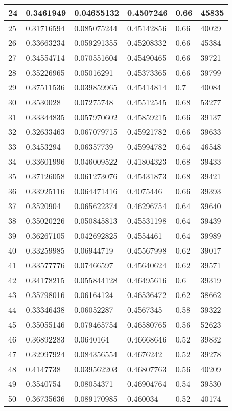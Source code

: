 \begin{longtable}{|l|l|l|l|l|l|}
24 & 0.3461949 & 0.04655132 & 0.4507246 & 0.66 & 45835 \\ \hline 
25 & 0.31716594 & 0.085075244 & 0.45142856 & 0.66 & 40029 \\ \hline 
26 & 0.33663234 & 0.059291355 & 0.45208332 & 0.66 & 45384 \\ \hline 
27 & 0.34554714 & 0.070551604 & 0.45490465 & 0.66 & 39721 \\ \hline 
28 & 0.35226965 & 0.05016291 & 0.45373365 & 0.66 & 39799 \\ \hline 
29 & 0.37511536 & 0.039859965 & 0.45414814 & 0.7 & 40084 \\ \hline 
30 & 0.3530028 & 0.07275748 & 0.45512545 & 0.68 & 53277 \\ \hline 
31 & 0.33344835 & 0.057970602 & 0.45859215 & 0.66 & 39137 \\ \hline 
32 & 0.32633463 & 0.067079715 & 0.45921782 & 0.66 & 39633 \\ \hline 
33 & 0.3453294 & 0.06357739 & 0.45994782 & 0.64 & 46548 \\ \hline 
34 & 0.33601996 & 0.046009522 & 0.41804323 & 0.68 & 39433 \\ \hline 
35 & 0.37126058 & 0.061273076 & 0.45431873 & 0.68 & 39421 \\ \hline 
36 & 0.33925116 & 0.064471416 & 0.4075446 & 0.66 & 39393 \\ \hline 
37 & 0.3520904 & 0.065622374 & 0.46296754 & 0.64 & 39640 \\ \hline 
38 & 0.35020226 & 0.050845813 & 0.45531198 & 0.64 & 39439 \\ \hline 
39 & 0.36267105 & 0.042692825 & 0.4554461 & 0.64 & 39989 \\ \hline 
40 & 0.33259985 & 0.06944719 & 0.45567998 & 0.62 & 39017 \\ \hline 
41 & 0.33577776 & 0.07466597 & 0.45640624 & 0.62 & 39571 \\ \hline 
42 & 0.34178215 & 0.055844128 & 0.46495616 & 0.6 & 39319 \\ \hline 
43 & 0.35798016 & 0.06164124 & 0.46536472 & 0.62 & 38662 \\ \hline 
44 & 0.33346438 & 0.06052287 & 0.4567345 & 0.58 & 39322 \\ \hline 
45 & 0.35055146 & 0.079465754 & 0.46580765 & 0.56 & 52623 \\ \hline 
46 & 0.36892283 & 0.0640164 & 0.46668646 & 0.52 & 39832 \\ \hline 
47 & 0.32997924 & 0.084356554 & 0.4676242 & 0.52 & 39278 \\ \hline 
48 & 0.4147738 & 0.039562203 & 0.46807763 & 0.56 & 40209 \\ \hline 
49 & 0.3540754 & 0.08054371 & 0.46904764 & 0.54 & 39530 \\ \hline 
50 & 0.36735636 & 0.089170985 & 0.460034 & 0.52 & 40174 \\ \hline 
\end{longtable}